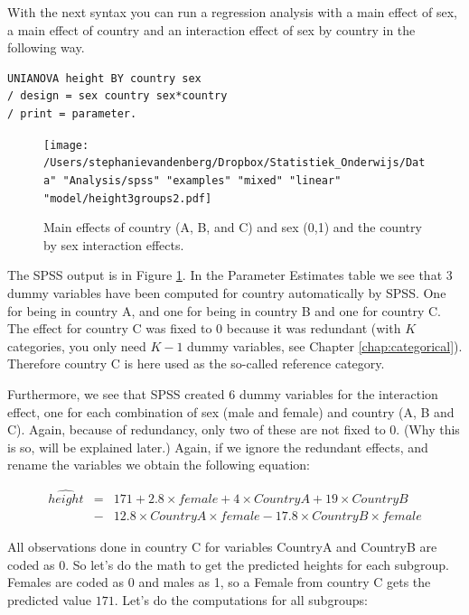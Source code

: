 \documentclass[]{book}\usepackage[]{graphicx}\usepackage[]{color}
\begin{document}
With the next syntax you can run a regression analysis with a main effect of sex, a main effect of country and an interaction effect of sex by country in the following way.

\begin{verbatim}
UNIANOVA height BY country sex 
/ design = sex country sex*country
/ print = parameter.
\end{verbatim}


\begin{figure}[h]
    \begin{center}
       \texttt{[image: /Users/stephanievandenberg/Dropbox/Statistiek\_Onderwijs/Data" "Analysis/spss" "examples" "mixed" "linear" "model/height3groups2.pdf]}
    \end{center}
    \label{fig:interactionheight3group}
    \caption{Main effects of country (A, B, and C) and sex (0,1) and the country by sex interaction effects.}
\end{figure}

The SPSS output is in Figure \ref{fig:interactionheight3group}. In the Parameter Estimates table we see that 3 dummy variables have been computed for country automatically by SPSS. One for being in country A, and one for being in country B and one for country C. The effect for country C was fixed to 0 because it was redundant (with $K$ categories, you only need $K-1$ dummy variables, see Chapter \ref{chap:categorical}). Therefore country C is here used as the so-called reference category. 

Furthermore, we see that SPSS created 6 dummy variables for the interaction effect, one for each combination of sex (male and female) and country (A, B and C). Again, because of redundancy, only two of these are not fixed to 0. (Why this is so, will be explained later.) Again, if we ignore the redundant effects, and rename the variables we obtain the following equation:


\begin{eqnarray} 
\widehat{height} &=& 171 + 2.8  \times female + 4 \times CountryA +  19 \times CountryB \nonumber\\ 
&-& 12.8 \times CountryA \times female - 17.8 \times CountryB \times female  \nonumber
\end{eqnarray}


All observations done in country C for variables CountryA and CountryB are coded as 0. So let's do the math to get the predicted heights for each subgroup. Females are coded as 0 and males as 1, so a Female from country C gets the predicted value $171$. Let's do the computations for all subgroups:
\end{document}
